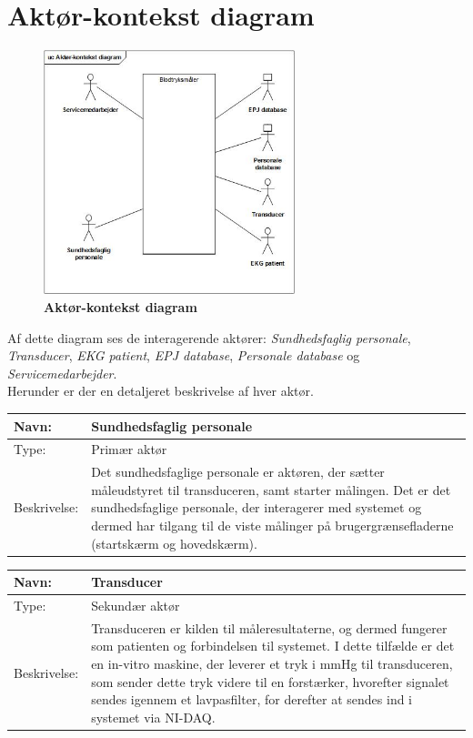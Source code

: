 \section{Aktør-kontekst diagram}
\begin{figure}[h!]
\includegraphics[width =0.65\textwidth , center]{billeder/Aktorkontekst.jpg}
\caption{\textbf{Aktør-kontekst diagram}}
\end{figure}
Af dette diagram ses de interagerende aktører: \textit{Sundhedsfaglig personale}, \textit{Transducer}, \textit{EKG patient}, \textit{EPJ database}, \textit{Personale database} og \textit{Servicemedarbejder}.\\ Herunder er der en detaljeret beskrivelse af hver aktør.
\begin{table}[h!]
\begin{tabular}{| >{\raggedright\arraybackslash}p{3cm} | >{\raggedright\arraybackslash}p{12cm} |}
   \hline
   Navn: & Sundhedsfaglig personale\\ \hline
   Type: & Primær aktør \\ \hline
   Beskrivelse: & Det sundhedsfaglige personale er aktøren, der sætter måleudstyret til transduceren, samt starter målingen. Det er det sundhedsfaglige personale, der interagerer med systemet og dermed har tilgang til de viste målinger på brugergrænsefladerne (startskærm og hovedskærm).\\ \hline
\end{tabular}
\end{table}
\begin{table}[h!]
\begin{tabular}{| >{\raggedright\arraybackslash}p{3cm} | >{\raggedright\arraybackslash}p{12cm} |}
   \hline
   Navn: & Transducer\\ \hline
   Type: & Sekundær aktør \\ \hline
   Beskrivelse: & Transduceren er kilden til måleresultaterne, og dermed fungerer som patienten og forbindelsen til systemet. I dette tilfælde er det en in-vitro maskine, der leverer et tryk i mmHg til transduceren, som sender dette tryk videre til en forstærker, hvorefter signalet sendes igennem et lavpasfilter, for derefter at sendes ind i systemet via NI-DAQ.\\ \hline
\end{tabular}
\end{table}
